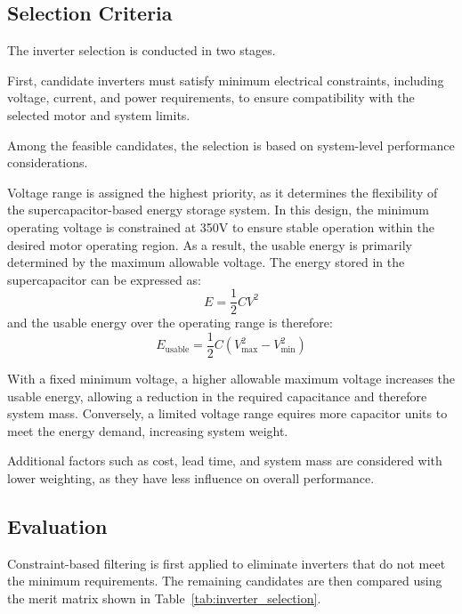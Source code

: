 \documentclass[11pt, a4paper]{report}
\numberwithin{equation}{section}
\begin{document}
\begin{refsection}
\subsection{Selection Criteria}

The inverter selection is conducted in two stages.

First, candidate inverters must satisfy minimum electrical constraints, including voltage, current, and power requirements, to ensure compatibility with the selected motor and system limits.

Among the feasible candidates, the selection is based on system-level performance considerations.

Voltage range is assigned the highest priority, as it determines the flexibility of the supercapacitor-based energy storage system. In this design, the minimum operating voltage is constrained at 350V to ensure stable operation within the desired motor operating region. As a result, the usable energy is primarily determined by the maximum allowable voltage. The energy stored in the supercapacitor can be expressed as:
\begin{equation}
E = \frac{1}{2} C V^2
\end{equation}
and the usable energy over the operating range is therefore:
\begin{equation}
E_{\text{usable}} = \frac{1}{2} C \left( V_{\max}^2 - V_{\min}^2 \right)
\end{equation}

With a fixed minimum voltage, a higher allowable maximum voltage increases the usable energy, allowing a reduction in the required capacitance and therefore system mass. Conversely, a limited voltage range equires more capacitor units to meet the energy demand, increasing system weight.

Additional factors such as cost, lead time, and system mass are considered with lower weighting, as they have less influence on overall performance.
\subsection{Evaluation}

Constraint-based filtering is first applied to eliminate inverters that do not meet the minimum requirements. The remaining candidates are then compared using the merit matrix shown in Table~\ref{tab:inverter_selection}.

\begin{table}[H]
\centering
\renewcommand{\arraystretch}{1}


\end{table}
\end{refsection}
\end{document}
